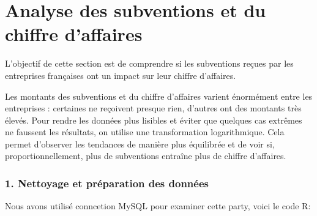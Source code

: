 \documentclass[mstat,12pt]{unswthesis}
\begin{document}
\newpage

\section{\texorpdfstring{\textbf{Analyse des subventions et du chiffre
d'affaires}}{Analyse des subventions et du chiffre d'affaires}}\label{analyse-des-subventions-et-du-chiffre-daffaires}

\medskip

L'objectif de cette section est de comprendre si les subventions reçues
par les entreprises françaises ont un impact sur leur chiffre
d'affaires.

Les montants des subventions et du chiffre d'affaires varient énormément
entre les entreprises : certaines ne reçoivent presque rien, d'autres
ont des montants très élevés. Pour rendre les données plus lisibles et
éviter que quelques cas extrêmes ne faussent les résultats, on utilise
une transformation logarithmique. Cela permet d'observer les tendances
de manière plus équilibrée et de voir si, proportionnellement, plus de
subventions entraîne plus de chiffre d'affaires.

\subsubsection{1. Nettoyage et préparation des
données}\label{nettoyage-et-pruxe9paration-des-donnuxe9es}

\medskip

Nous avons utilisé conncetion MySQL pour examiner cette party, voici le
code R:

\medskip

\footnotesize
\end{document}

